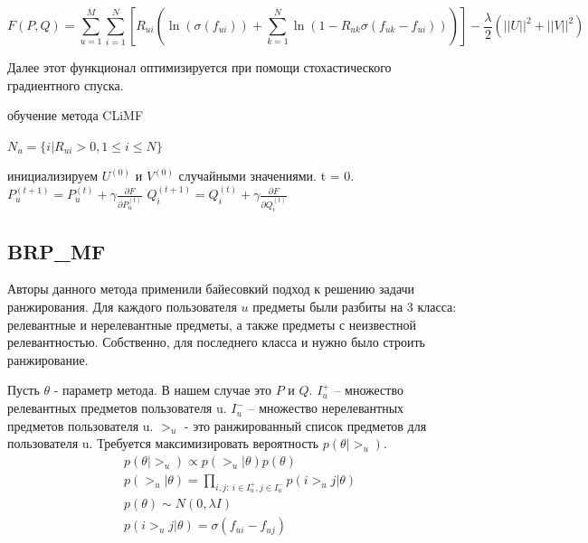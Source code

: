 \documentclass[a4paper,12pt]{article}
\begin{document}
\begin{equation*}
	F(P, Q) = \sum_{u=1}^M \sum_{i=1}^N [R_{ui}(\ln(\sigma(f_{ui})) + \sum_{k=1}^N \ln(1 - R_{uk}\sigma(f_{uk} - f_{ui})))] - \frac{\lambda}{2}({||U||}^2 + {||V||}^2 ) 
	\end{equation*}	

Далее этот функционал оптимизируется при помощи стохастического градиентного спуска.

\begin{algorithm}[h]
\caption{обучение метода CLiMF}
\begin{algorithmic}[1]
\State $N_u = \{i | R_{ui} > 0, 1 \leq i \leq N\}$
\EndFor

инициализируем $U^{(0)}$ и $V^{(0)}$ случайными значениями. t = 0.
\Repeat {} 
		\State $P_u^{(t+1)} = P_u^{(t)} + \gamma \frac{\partial F}{\partial P_u^{(t)}}$
				\State 	$Q_i^{(t+1)} = Q_i^{(t)} + \gamma \frac{\partial F}{\partial 	  																						Q_i^{(t)}}$		
			\EndFor	
	\EndFor 
{}

\end{algorithmic}
\label{alg:climf}
\end{algorithm}
\newpage
\subsection{BRP\_MF}  	

Авторы данного метода применили байесовкий подход к решению задачи ранжирования. Для каждого пользователя $u$  предметы были разбиты на 3 класса: релевантные и нерелевантные предметы, а также предметы с неизвестной релевантностью. Собственно, для последнего класса и нужно было строить ранжирование. 



Пусть $\theta$ - параметр метода. В нашем случае это $P$ и $Q$.  $I_u^+$ -- множество релевантных предметов пользователя u. $I_u^-$ -- множество нерелевантных предметов пользователя u.  $>_u$ - это ранжированный список предметов для пользователя u. Требуется максимизировать вероятность $p(\theta|>_u)$.
\begin{equation*}
\begin{split}
	& p(\theta| >_u) \propto p(>_u| \theta)p(\theta) \\
	& p(>_u| \theta) = \prod_{i, j: \ i \in I_u^+, j \in I_u^-}p(i >_u j| \theta)\\
	& p(\theta) \sim N(0, \lambda I) \\
	& p(i >_u j| \theta) = \sigma(f_{ui} - f_{uj}) 
\end{split}
\end{equation*}
\end{document}
